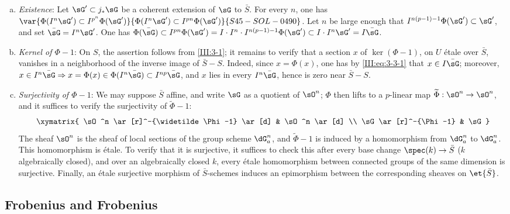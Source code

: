 \begin{enumerate}[a)]
  \item \emph{Existence}: Let $\sG'\subset j_*\sG$ be a coherent extension
    of $\sG$ to $\bar S$. For every $n$, one has
    $\var{\Phi(I^n \sG')\subset I^{p^n}\Phi(\sG')}{\Phi(I^n \sG')\subset I^{p n}\Phi(\sG')}{S45-SOL-0490}$. Let $n$ be large enough that
    $I^{n(p-1)-1}\Phi(\sG')\subset \sG'$, and set $\bar\sG=I^n\sG'$.
    One has $\Phi(\bar\sG)\subset I^{p n}\Phi(\sG')
    =I\cdot I^n\cdot I^{n(p-1)-1}\Phi(\sG')\subset I\cdot I^n\sG'
    = I\bar\sG$.
  \item {}\emph{Kernel of $\Phi-1$}: On $S$, the assertion follows from
    \ref{III:3-1}; it remains to verify that a section $x$ of
    $\ker(\Phi-1)$, on $U$ étale over $\bar S$, vanishes in a neighborhood of
    the inverse image of $\bar S-S$. Indeed, since $x=\Phi(x)$, one
    has by \eqref{III:eq:3-3-1} that $x\in I\bar\sG$; moreover,
    $x\in I^n\bar\sG\Rightarrow x=\Phi(x)\in\Phi(I^n\bar\sG)\subset I^{n p}\bar\sG$, and $x$ lies in every $I^n\bar\sG$, hence is zero near $\bar S-S$.
  \item \emph{Surjectivity of $\Phi-1$}: We may suppose $\bar S$ affine, and
    write $\sG$ as a quotient of $\sO^n$; $\Phi$ then lifts to a $p$-linear
    map $\widetilde\Phi:\sO^n\to\sO^n$, and it suffices to verify the
    surjectivity of $\widetilde\Phi-1$:
    \[\xymatrix{
      \sO^n \ar[r]^-{\widetilde \Phi-1} \ar[d]
        & \sO^n \ar[d] \\
      \sG \ar[r]^-{\Phi-1}
        & \sG
    }\]
    The sheaf $\sO^n$ is the sheaf of local sections of the group scheme
    $\dG_a^n$, and $\widetilde\Phi-1$ is induced by a homomorphism from
    $\dG_a^n$ to $\dG_a^n$. This homomorphism is étale. To verify that it is
    surjective, it suffices to check this after every base change
    $\spec(k)\to\bar S$ ($k$ algebraically closed), and over an algebraically
    closed $k$, every étale homomorphism between connected groups of the same
    dimension is surjective. Finally, an étale surjective morphism of
    $\bar S$-schemes induces an epimorphism between the corresponding sheaves
    on $\et{\bar S}$.
\end{enumerate}






\subsection{Frobenius and Frobenius}\label{III:3-4}

